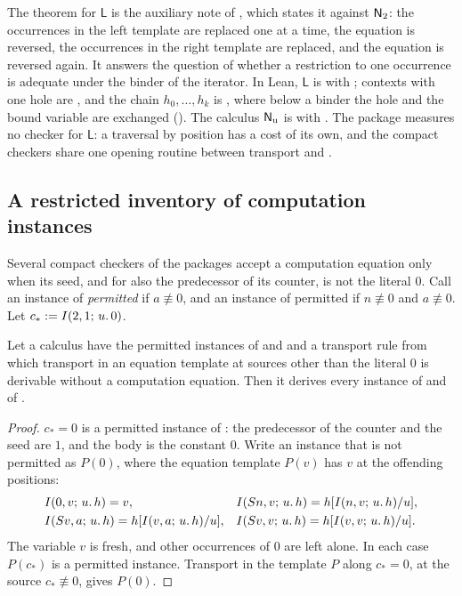 \begin{remark}[Sources]
\label{kern:rem:onehole-sources}
The theorem for $\mathsf{L}$ is the auxiliary note of
, which states it against $\mathsf{N}_{2}$: the occurrences
in the left template are replaced one at a time, the equation is reversed,
the occurrences in the right template are replaced, and the equation is
reversed again.  It answers the question of  whether a
restriction to one occurrence is adequate under the binder of the iterator.
In Lean, $\mathsf{L}$ is  with ; contexts
with one hole are , and the chain $h_0,\dots,h_k$ is
, where below a binder the hole and the bound variable are
exchanged ().  The calculus $\mathsf{N}_{\mathrm{u}}$ is
 with .  The package measures no checker for
$\mathsf{L}$: a traversal by position has a cost of its own, and the compact
checkers share one opening routine between transport and .
\end{remark}

\subsection{A restricted inventory of computation instances}
\label{kern:sec:comprepair}

Several compact checkers of the packages accept a computation equation only
when its seed, and for  also the predecessor of its counter, is
not the literal $0$.  Call an instance of  \emph{permitted} if
$a\not\equiv 0$, and an instance of  permitted if
$n\not\equiv 0$ and $a\not\equiv 0$.  Let $c_{*}\mathrel{:=}I(2,1;\,u.\,0)$.

\begin{lemma}
\label{kern:lem:comprepair}
Let a calculus have the permitted instances of  and
 and a transport rule from which transport in an equation
template at sources other than the literal $0$ is derivable without a
computation equation.  Then it derives every instance of  and
of .
\end{lemma}

\begin{proof}
$c_{*}=0$ is a permitted instance of : the predecessor of the
counter and the seed are $1$, and the body is the constant $0$.  Write an
instance that is not permitted as $P(0)$, where the equation template $P(v)$
has $v$ at the offending positions:
\begin{align*}
 &I(0,v;\,u.\,h)=v, &
 &I(S n,v;\,u.\,h)=h[I(n,v;\,u.\,h)/u],\\
 &I(S v,a;\,u.\,h)=h[I(v,a;\,u.\,h)/u], &
 &I(S v,v;\,u.\,h)=h[I(v,v;\,u.\,h)/u].
\end{align*}
The variable $v$ is fresh, and other occurrences of $0$ are left alone.  In
each case $P(c_{*})$ is a permitted instance.  Transport in the template $P$
along $c_{*}=0$, at the source $c_{*}\not\equiv 0$, gives $P(0)$.
\end{proof}


